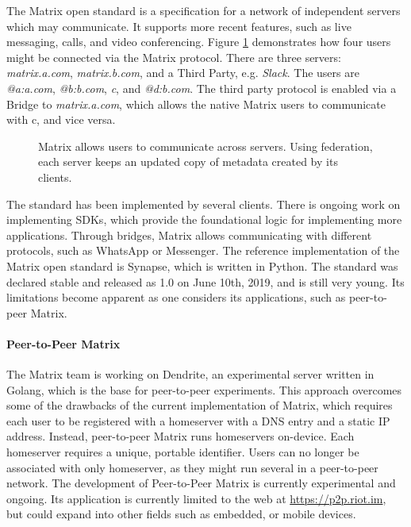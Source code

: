 The Matrix open standard\cite{matrix_org_spec} is a specification for a network of independent servers which may communicate.
It supports more recent features, such as live messaging, calls, and video conferencing.
Figure \ref{fig:matrix_structure} demonstrates how four users might be connected via the Matrix protocol.
There are three servers: \textit{matrix.a.com}, \textit{matrix.b.com}, and a Third Party, e.g. \textit{Slack}.
The users are \textit{@a:a.com}, \textit{@b:b.com}, \textit{c}, and \textit{@d:b.com}.
The third party protocol is enabled via a Bridge to \textit{matrix.a.com}, which allows the native Matrix users to communicate with c, and vice versa.

\begin{figure}
    \centering
    \resizebox{0.7\linewidth}{!}{}
    \caption{
        Matrix allows users to communicate across servers. 
        Using federation, each server keeps an updated copy of metadata created by its clients.}
    \label{fig:matrix_structure}
\end{figure}

The standard has been implemented by several clients\cite{matrix_org_clients}.
There is ongoing work on implementing SDKs\cite{matrix_org_sdks}, which provide the foundational logic for implementing more applications.
Through bridges, Matrix allows communicating with different protocols\cite{matrix_org_bridges}, such as WhatsApp or Messenger.
The reference implementation of the Matrix open standard is Synapse\cite{matrix_org_synapse}, which is written in Python.
The standard was declared stable and released as 1.0 on June 10th, 2019\cite{matrix_org_spec}, and is still very young.
Its limitations become apparent as one considers its applications, such as peer-to-peer Matrix.


\paragraph{Peer-to-Peer Matrix}
The Matrix team is working on Dendrite\cite{matrix_org_dendrite}, an experimental server written in Golang, which is the base for peer-to-peer experiments.
This approach overcomes some of the drawbacks of the current implementation of Matrix, which requires each user to be registered with a homeserver with a DNS entry and a static IP address.
Instead, peer-to-peer Matrix runs homeservers on-device.
Each homeserver requires a unique, portable identifier.
Users can no longer be associated with only homeserver, as they might run several in a peer-to-peer network.
The development of Peer-to-Peer Matrix is currently experimental and ongoing.
Its application is currently limited to the web at \url{https://p2p.riot.im}, but could expand into other fields such as embedded, or mobile devices.


